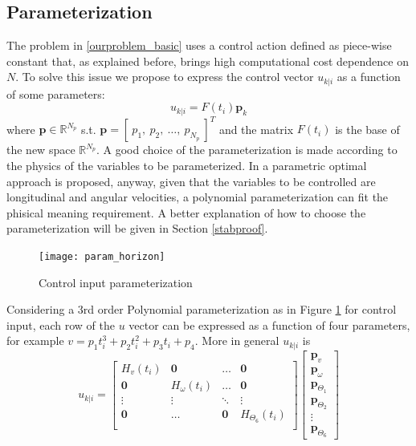 \subsection{Parameterization}

The problem in \ref{ourproblem_basic} uses a control action defined as piece-wise constant that, as explained before, brings high computational cost dependence on $N$. To solve this issue we propose to express the control vector ${u}_{k|i}$ as a function of some parameters:
\begin{equation}\label{param_eq}
{u}_{k|i}=F(t_i)\textbf{p}_k
\end{equation}
where $\textbf{p} \in \mathbb{R}^{N_p}$ s.t. $\textbf{p}=[\ p_1,\ p_2,\ \dots,\ p_{N_p}\ ]^T$ and the matrix $F(t_i)$ is the base of the new space $\mathbb{R}^{N_p}$. A good choice of the parameterization is made according to the physics of the variables to be parameterized. In \cite{kelly2013mobile} a parametric optimal approach is proposed, anyway, given that the variables to be controlled are longitudinal and angular velocities, a polynomial parameterization can fit the phisical meaning requirement. A better explanation of how to choose the parameterization will be given in Section \ref{stabproof}.
\begin{figure}[h!]
	\centering
	\texttt{[image: param\_horizon]}
	\caption{Control input parameterization}
	\label{param_horizon}
\end{figure}
Considering a 3rd order Polynomial parameterization as in Figure \ref{param_horizon} for control input, each row of the ${u}$ vector can be expressed as a function of four parameters, for example $v=p_1t_i^3+p_2t_i^2+p_3t_i+p_4$. More in general ${u}_{k|i}$ is
\begin{equation}
{u}_{k|i}=\left[ \begin{matrix}
H_v(t_i)          & \textbf{0} & \dots      & \textbf{0}  \\
\textbf{0} &     H_\omega(t_i)      & \dots      & \textbf{0}  \\
\vdots     & \vdots     & \ddots     & \vdots      \\
\textbf{0} & \dots      & \textbf{0} &   H_{\Theta_6}(t_i)         \\
\end{matrix} \right] \left[ \begin{matrix} \textbf{p}_v \\ \textbf{p}_{\omega} \\ \textbf{p}_{\Theta_1} \\ \textbf{p}_{\Theta_2} \\ \vdots \\ \textbf{p}_{\Theta_6} \end{matrix} \right]
\end{equation}
